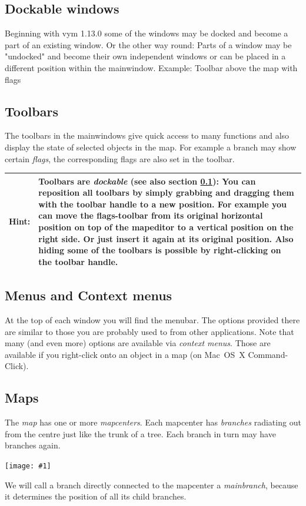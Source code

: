 \documentclass[12pt,a4paper]{article}
\newcommand{\maximage}[1]{  
    \begin{center}
        \texttt{[image: \#1]} 
    \end{center}
}
\newcommand{\hint}[1]{
    \begin{center} 
        \begin{tabular}{|rp{12cm}|} \hline
            {\bf Hint}:& #1\\   \hline
        \end{tabular}
            \marginpar{\Huge !} 
    \end{center} 
}
\newcommand{\vym}{{\sc vym }}
\begin{document}
\subsection{Dockable windows} \label{dockable}
Beginning with \vym 1.13.0 some of the windows may be docked and become
a part of an existing window. Or the other way round: Parts of a window
may be "undocked" and become their own independent windows or can be
placed in a different position within the mainwindow. Example: Toolbar
above the map with flags

\subsection{Toolbars}
The toolbars in the mainwindows give quick access to many functions and
also display the state of selected objects in the map. For example a
branch may show certain {\em flags}, the corresponding flags are also
set in the toolbar. 

\hint {Toolbars are {\em dockable} (see also section \ref{dockable}):
You can reposition all toolbars by simply grabbing and dragging them
with the toolbar handle to a new position. For example you can move the
flags-toolbar from its original horizontal position on top of the
mapeditor to a vertical position on the right side.  Or just insert it
again at its original position. Also hiding some of the toolbars is
possible by right-clicking on the toolbar handle.}

\subsection{Menus and Context menus}
At the top of each window you will find the menubar. The options
provided there are similar to those you are probably used to from other
applications. Note that many (and even more) options are available via
{\em context menus}. Those are available if you right-click onto an
object in a map (on Mac~OS~X Command-Click).

\subsection{Maps}
The  {\em map} has one or more {\em mapcenters}.  Each mapcenter has
{\em branches} radiating out from the centre just like the trunk of a
tree. Each branch in turn may have branches again.
\maximage{images/branches.png} 
We will call a branch directly connected to the mapcenter a {\em
mainbranch}, because it determines the position of all its child
branches.
\end{document}
